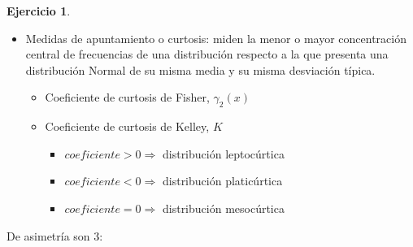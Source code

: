 \documentclass[a4paper, 12pt]{article}
\theoremstyle{definition}
\newtheorem{ej}{Ejercicio}
\begin{document}
\begin{ej}
\begin{enumerate}[label=\textit{\alph*)}]
{\begin{minipage}[h!]{1\linewidth}
\begin{itemize}
        \item Medidas de apuntamiento o curtosis: miden la menor o mayor concentración central de frecuencias de una distribución respecto a la que presenta una distribución Normal de su misma media y su misma desviación típica.
        \begin{itemize}
            \item Coeficiente de curtosis de Fisher,  $\gamma_{2}(x)$
            \item Coeficiente de curtosis de Kelley,  $K$
            \begin{itemize}
                \item $coeficiente > 0 \Rightarrow$ distribución leptocúrtica
                \item $coeficiente < 0 \Rightarrow$ distribución platicúrtica
                \item $coeficiente = 0 \Rightarrow$ distribución mesocúrtica
            \end{itemize}
        \end{itemize}
    \end{itemize}
    \end{minipage}
    }

\bigskip
    
    De asimetría son 3: \\
  

\end{enumerate}
\end{ej}
\end{document}
